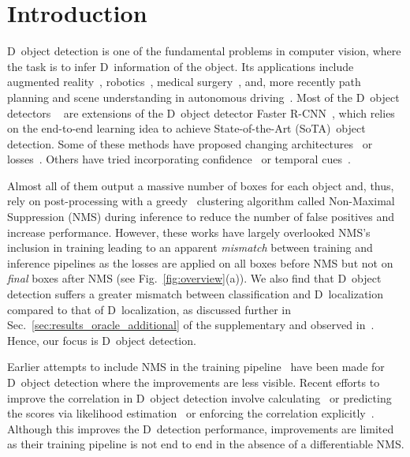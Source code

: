 \documentclass[final]{cvpr}
\newcommand{\myReferFigure}[1]{Fig.~\ref{#1}}
\newcommand{\myReferSection}[1]{Sec.~\ref{#1}}
\newcommand{\twoD}{D}
\newcommand{\threeD}{D}
\newcommand{\sota}{SoTA}
\begin{document}
\section{Introduction}\label{sec:Introduction}
    \threeD~object detection is one of the fundamental problems in computer vision, where the task is to infer \threeD~information of the object. Its applications include augmented reality~\cite{alhaija2018augmented,rematas2018soccer}, robotics~\cite{saxena2008robotic,levine2018learning}, medical surgery~\cite{rey2002automatic}, and, more recently path planning and scene understanding in autonomous driving~\cite{chen2017multi,huang2020epnet,simonelli2020disentangling,li2020rtm3d}. Most of the \threeD~object detectors 
    ~\cite{chen2017multi,li2019gs3d,huang2020epnet,simonelli2020disentangling,li2020rtm3d} are extensions of the \twoD~object  
    detector Faster R-CNN~\cite{ren2015faster}, which relies on the end-to-end learning idea to achieve State-of-the-Art (\sota)~object detection.
    Some of these methods have proposed changing 
    architectures~\cite{simonelli2020disentangling,shi2020distance,li2020rtm3d} or losses~\cite{brazil2019m3d,chen2020monopair}. 
    Others have tried incorporating confidence~\cite{simonelli2020disentangling,brazil2020kinematic,shi2020distance} 
    or temporal cues~\cite{brazil2020kinematic}.
    
    Almost all of them output a massive number of boxes for each object and, thus, rely on post-processing with a greedy~\cite{prokudin2017learning} clustering algorithm called Non-Maximal Suppression (NMS) during inference to reduce the number of false positives and increase performance. 
    However, these works have largely overlooked NMS's inclusion in training leading to an apparent \emph{mismatch} between training and inference pipelines as the losses are applied on all boxes before NMS but not on \emph{final} boxes after NMS (see \myReferFigure{fig:overview}(a)).\linebreak
    We also find that \threeD~object detection suffers a greater mismatch between classification and \threeD~localization compared to that of \twoD~localization, as discussed further in \myReferSection{sec:results_oracle_additional} of the supplementary and observed in~\cite{huang2020epnet, brazil2020kinematic, shi2020distance}.
    Hence, our focus is \threeD~object detection. 


    Earlier attempts to include NMS in the training pipeline~\cite{hosang2016convnet, prokudin2017learning, hosang2017learning} have been made for \twoD~object detection where the improvements are less visible.
    Recent efforts to improve the correlation in \threeD~object detection involve calculating~\cite{simonelli2019disentangling, simonelli2020disentangling} or predicting~\cite{brazil2020kinematic, shi2020distance} the scores via likelihood estimation~\cite{kumar2020luvli} or enforcing the correlation explicitly~\cite{huang2020epnet}. 
    Although this improves the \threeD~detection performance, 
    improvements are limited as their training pipeline is not end to end in the absence of a differentiable NMS. 
    
\end{document}

